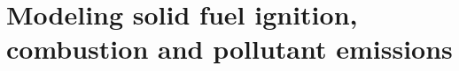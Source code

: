 

\renewcommand{\Project}{Ex}
\renewcommand{\ChapterTitle}{Modeling solid fuel ignition, combustion and pollutant emissions}
\renewcommand{\ProjectTitle}{Direct numerical simulation and modelling of oxy-fuel combustion processes}



\chapter{\ChapterTitle}



